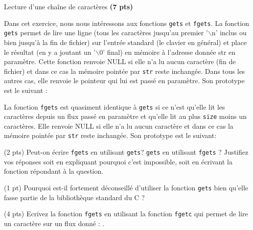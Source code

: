 \documentclass[10pt]{article}
\begin{document}
\begin{Exercice} Lecture d'une chaîne de caractères \textbf{(7 pts)} 

  Dans cet exercice, nous nous intéressons aux fonctions \texttt{gets} et
  \texttt{fgets}. La fonction \texttt{gets} permet de lire une ligne (tous les
  caractères jusqu'au premier '$\backslash$n' inclus ou bien jusqu'à la fin de
  fichier) sur l'entrée standard (le clavier en général) et place le résultat
  (en y a joutant un '$\backslash$0' final) en mémoire à l'adresse donnée str
  en paramètre.  Cette fonction renvoie NULL si elle n'a lu aucun caractère
  (fin de fichier) et dans ce cas la mémoire pointée par \texttt{str} reste
  inchangée. Dans tous les autres cas, elle renvoie le pointeur qui lui est
  passé en paramètre. Son prototype est le suivant :

  La fonction \texttt{fgets} est quasiment identique à \texttt{gets} si ce
  n'est qu'elle lit les caractères depuis un flux passé en paramètre et qu'elle
  lit au plus \texttt{size} moins un caractères. Elle renvoie NULL si elle n'a
  lu aucun caractère et dans ce cas la mémoire pointée par \texttt{str} reste
  inchangée. Son prototype est le suivant:

  \Question (2 pts) Peut-on écrire \texttt{fgets} en utilisant
  \texttt{gets}?  \texttt{gets} en utilisant \texttt{fgets} ? Justifiez vos
  réponses soit en expliquant pourquoi c'est impossible, soit en écrivant la
  fonction répondant à la question.

  \Question (1 pt) Pourquoi est-il fortement déconseillé d'utiliser la
  fonction \texttt{gets} bien qu'elle fasse partie de la bibliothèque standard
  du C ?

  \Question (4 pts) Ecrivez la fonction \texttt{fgets} en utilisant la
  fonction \texttt{fgetc} qui permet de lire un caractère sur un flux donné :
  .

\end{Exercice}
\end{document}
